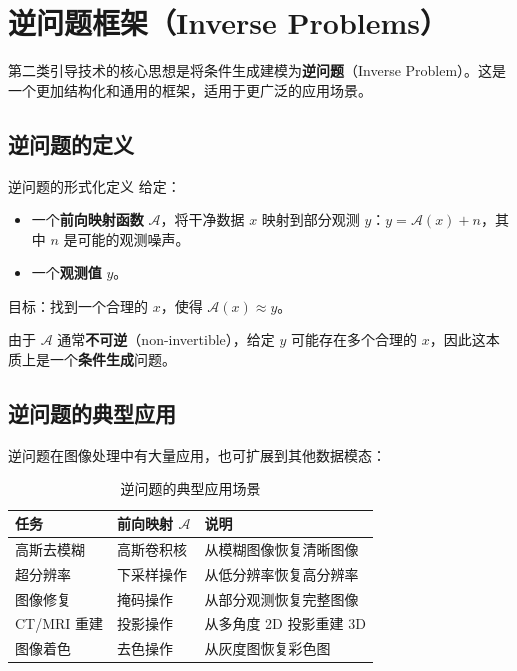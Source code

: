 \section{逆问题框架（Inverse Problems）}

第二类引导技术的核心思想是将条件生成建模为\textbf{逆问题}（Inverse Problem）。这是一个更加结构化和通用的框架，适用于更广泛的应用场景。

\subsection{逆问题的定义}

\begin{importantbox}{逆问题的形式化定义}
给定：
\begin{itemize}
    \item 一个\textbf{前向映射函数} $\mathcal{A}$，将干净数据 $x$ 映射到部分观测 $y$：$y = \mathcal{A}(x) + n$，其中 $n$ 是可能的观测噪声。
    \item 一个\textbf{观测值} $y$。
\end{itemize}
目标：找到一个合理的 $x$，使得 $\mathcal{A}(x) \approx y$。

由于 $\mathcal{A}$ 通常\textbf{不可逆}（non-invertible），给定 $y$ 可能存在多个合理的 $x$，因此这本质上是一个\textbf{条件生成}问题。
\end{importantbox}

\subsection{逆问题的典型应用}

逆问题在图像处理中有大量应用，也可扩展到其他数据模态：

\begin{table}[H]
\centering
\begin{tabular}{lll}
\toprule
\textbf{任务} & \textbf{前向映射 $\mathcal{A}$} & \textbf{说明} \\
\midrule
高斯去模糊 & 高斯卷积核 & 从模糊图像恢复清晰图像 \\
超分辨率 & 下采样操作 & 从低分辨率恢复高分辨率 \\
图像修复 & 掩码操作 & 从部分观测恢复完整图像 \\
CT/MRI 重建 & 投影操作 & 从多角度 2D 投影重建 3D \\
图像着色 & 去色操作 & 从灰度图恢复彩色图 \\
\bottomrule
\end{tabular}
\caption{逆问题的典型应用场景}
\end{table}

